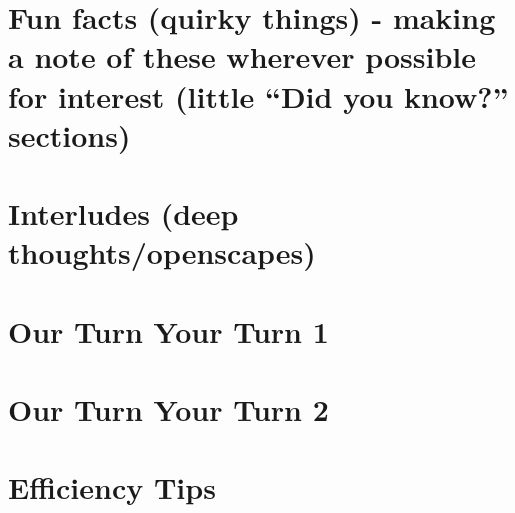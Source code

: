 \documentclass[]{book}
\begin{document}
\hypertarget{fun-facts-quirky-things---making-a-note-of-these-wherever-possible-for-interest-little-did-you-know-sections-2}{%
\section{Fun facts (quirky things) - making a note of these wherever possible for interest (little ``Did you know?'' sections)}\label{fun-facts-quirky-things---making-a-note-of-these-wherever-possible-for-interest-little-did-you-know-sections-2}}

\hypertarget{interludes-deep-thoughtsopenscapes-6}{%
\section{Interludes (deep thoughts/openscapes)}\label{interludes-deep-thoughtsopenscapes-6}}

\hypertarget{our-turn-your-turn-1-1}{%
\section{Our Turn Your Turn 1}\label{our-turn-your-turn-1-1}}

\hypertarget{our-turn-your-turn-2-2}{%
\section{Our Turn Your Turn 2}\label{our-turn-your-turn-2-2}}

\hypertarget{efficiency-tips-7}{%
\section{Efficiency Tips}\label{efficiency-tips-7}}


\end{document}
